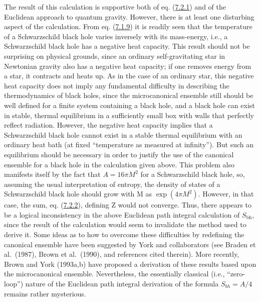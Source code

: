 \documentclass[11pt,a4paper]{article}
\begin{document}
The result of this calculation is supportive both of eq. (\hyperref[eq:7.2.1]{7.2.1}) and of the Euclidean approach to quantum gravity. However, there is at least one disturbing aspect of the calculation. From eq. (\hyperref[eq:7.1.9]{7.1.9}) it is readily seen that the temperature of a Schwarzschild black hole varies inversely with its mass-energy, i.e., a Schwarzschild black hole has a negative heat capacity. This result should not be surprising on physical grounds, since an ordinary self-gravitating star in Newtonian gravity also has a negative heat capacity; if one removes energy from a star, it contracts and heats up. As in the case of an ordinary star, this negative heat capacity does not imply any fundamental difficulty in describing the thermodynamics of black holes, since the microcanonical ensemble still should be well defined for a finite system containing a black hole, and a black hole can exist in stable, thermal equilibrium in a sufficiently small box with walls that perfectly reflect radiation. However, the negative heat capacity implies that a Schwarzschild black hole cannot exist in a stable thermal equilibrium with an ordinary heat bath (at fixed ``temperature as measured at infinity''). But such an equilibrium should be necessary in order to justify the use of the canonical ensemble for a black hole in the calculation given above. This problem also manifests itself by the fact that \(A = 16\pi M^2\) for a Schwarzschild black hole, so, assuming the usual interpretation of entropy, the density of states of a Schwarzschild black hole should grow with M as \(\exp(4\pi M^2)\). However, in that case, the sum, eq. (\hyperref[eq:7.2.2]{7.2.2}), defining Z would not converge. Thus, there appears to be a logical inconsistency in the above Euclidean path integral calculation of \(S_{\mathrm{bh}}\), since the result of the calculation would seem to invalidate the method used to derive it. Some ideas as to how to overcome these difficulties by redefining the canonical ensemble have been suggested by York and collaborators (see Braden et al.~(1987), Brown et al.~(1990), and references cited therein). More recently, Brown and York (1993a,b) have proposed a derivation of these results based upon the microcanonical ensemble. Nevertheless, the essentially classical (i.e., ``zero-loop'') nature of the Euclidean path integral derivation of \hypertarget{source-179}{} the formula \(S_{bh} = A/4\) remains rather mysterious.
\end{document}
